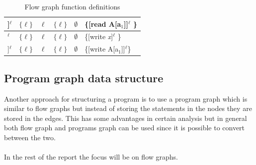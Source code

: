 \begin{table}
\begin{tabular}{| l | l | l | l | l | l |}
\hline
[read A[a$_1$]]$^\ell$                & $\{\ell\}$                                            &$\ell$                & $\{\ell\}$  & $\emptyset$                                            &\{[read A[a$_1$]]$^\ell$ \}   \\
\hline
[write \textsl{x}]$^\ell$               & $\{\ell\}$                                            &$\ell$                & $\{\ell\}$  & $\emptyset$                                          &\{[write \textsl{x}]$^\ell$ \} \\
\hline
[write A[a$_1$]]$^\ell$               & $\{\ell\}$                                            &$\ell$                & $\{\ell\}$  & $\emptyset$                                          &\{[write A[a$_1$]]$^\ell$\} \\
\hline
\end{tabular}
\centering
\caption{Flow graph function definitions}
\label{table:flow_graph_functions}
\end{table}

\subsection{Program graph data structure}
Another approach for structuring a program is to use a program graph which is similar to flow graphs but instead of storing the statements in the nodes they are stored in the edges. This has some advantages in certain analysis but in general both flow graph and programs graph can be used since it is possible to convert between the two.
\\\\
In the rest of the report the focus will be on flow graphs.